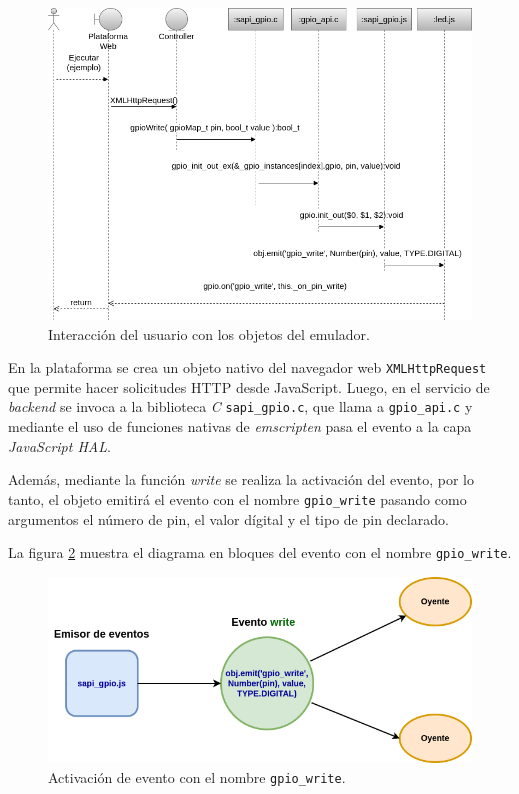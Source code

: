 \begin{figure}[ht]
	\centering
	\includegraphics[scale=.49]{./Figures/DiagramaSecuencia.png}
	\caption{Interacción del usuario con los objetos del emulador.}
	\label{fig:DiagramaSecuencia}
\end{figure}


En la plataforma se crea un objeto nativo del navegador web \texttt{XMLHttpRequest} que permite hacer solicitudes HTTP desde JavaScript. Luego, en el servicio de \textit{backend} se invoca a la biblioteca \textit{C} \texttt{sapi\_gpio.c}, que llama a \texttt{gpio\_api.c} y mediante el uso de funciones nativas de \textit{emscripten} pasa el evento a la capa \textit{JavaScript HAL}. 

Además, mediante la función \textit{write} se realiza la activación del evento, por lo tanto, el objeto emitirá el evento con el nombre \texttt{gpio\_write} pasando como argumentos el número de pin, el valor dígital y el tipo de pin declarado. 

\hfill \break
\hfill \break
\hfill \break

La figura \ref{fig:GPIOEventEmitter} muestra el diagrama en bloques del evento con el nombre \newline \texttt{gpio\_write}.

\begin{figure}[ht]
	\centering
	\includegraphics[scale=.50]{./Figures/GPIOEventEmitter.png}
	\caption{Activación de evento con el nombre \texttt{gpio\_write}.}
	\label{fig:GPIOEventEmitter}
\end{figure}



